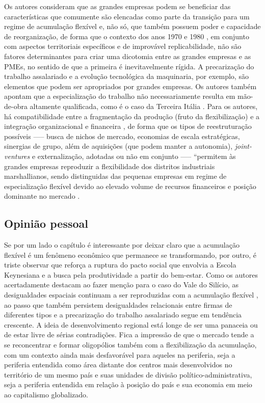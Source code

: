 \documentclass[hidelinks,a4paper,reprint,prl]{revtex4}
\begin{document}
	Os autores consideram que as grandes empresas podem se beneficiar das características que comumente são elencadas como parte da transição para um regime de acumulação flexível e, não só, que também possuem poder e capacidade de reorganização, de forma que o contexto dos anos 1970 e 1980 \cite[p.117]{martinelli1994}, em conjunto com aspectos territoriais específicos e de improvável replicabilidade, não são fatores determinantes para criar uma dicotomia entre as grandes empresas e as PMEs, no sentido de que a primeira é inevitavelmente rígida. A precarização do trabalho assalariado \cite[p.109; p.115--117]{martinelli1994} e a evolução tecnológica da maquinaria, por exemplo, são elementos que podem ser apropriados por grandes empresas. Os autores também apontam que a especialização do trabalho não necessariamente resulta em mão-de-obra altamente qualificada, como é o caso da Terceira Itália \cite[p.109]{martinelli1994}. Para os autores, há compatibilidade entre a fragmentação da produção (fruto da flexibilização) e a integração organizacional e financeira \cite[p.113]{martinelli1994}, de forma que os tipos de reestruturação possíveis ----- busca de nichos de mercado, economias de escala estratégicas, sinergias de grupo, além de aquisições (que podem manter a autonomia), \textit{joint-ventures} e externalização, adotadas ou não em conjunto ----- ``permitem às grandes empresas reproduzir a flexibilidade dos distritos industriais marshallianos, sendo distinguidas das pequenas empresas em regime de especialização flexível devido ao elevado volume de recursos financeiros e posição dominante no mercado \cite[p.113]{martinelli1994}.
	
	\subsection{Opinião pessoal}
	
	Se por um lado o capítulo é interessante por deixar claro que a acumulação flexível é um fenômeno econômico que permanece se transformando, por outro, é triste observar que reforça a ruptura do pacto social que envolvia a Escola Keynesiana e a busca pela produtividade a partir do bem-estar. Como os autores acertadamente destacam ao fazer menção para o caso do Vale do Silício, as desigualdades espaciais continuam a ser reproduzidas com a acumulação flexível \cite[p.110; p.116]{martinelli1994}, ao passo que também persistem desigualdades relacionais entre firmas de diferentes tipos \cite[p.114]{martinelli1994} e a precarização do trabalho assalariado segue em tendência crescente. A ideia de desenvolvimento regional está longe de ser uma panaceia ou de estar livre de sérias contradições. Fica a impressão de que o mercado tende a se reconcentrar e formar oligopólios também com a flexibilização da acumulação, com um contexto ainda mais desfavorável para aqueles na periferia, seja a periferia entendida como área distante dos centros mais desenvolvidos no território de um mesmo país e suas unidades de divisão político-administrativa, seja a periferia entendida em relação à posição do país e sua economia em meio ao capitalismo globalizado.
	
	
	
	
\end{document}
